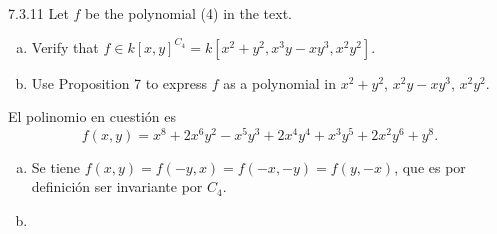 \documentclass[twoside]{article}
\begin{document}
\begin{ejercicio}{7.3.11}
Let $f$ be the polynomial (4) in the text.
\begin{enumerate}[a.]
\item Verify that $f ∈ k[x, y]^{C_4} = k[x^2 + y^2, x^3y − xy^3, x^2y^2]$.
\item Use Proposition 7 to express $f$ as a polynomial in $x^2 + y^2$, $x^2y − xy^3$, $x^2y^2$.
\end{enumerate}
\end{ejercicio}
\begin{solucion} 
El polinomio en cuestión es $$f (x, y) = x^8 + 2x^6y^2 − x^5y^3 + 2x^4y^4 + x^3y^5 + 2x^2y^6 + y^8.$$
\begin{enumerate}[a.]
\item Se tiene $f(x,y)=f(-y,x)=f(-x,-y)=f(y,-x)$, que es por definición ser invariante por $C_4$.
\item 
\end{enumerate}
\end{solucion}
\end{document}

